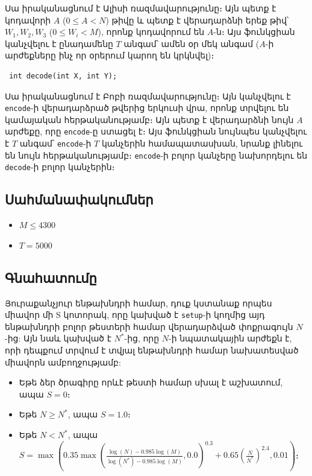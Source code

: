 \documentclass[12pt]{article}
\begin{document}
Սա իրականացնում է Ալիսի ռազմավարությունը։ Այն պետք է կոդավորի  $A$ ($0 \leq A < N$) թիվը և պետք է վերադարձնի երեք թիվ՝ $W_1, W_2, W_3$ ($0 \leq W_i < M$), որոնք կոդավորում են $A$-ն։ Այս ֆունկցիան կանչվելու է ընադամենը $T$ անգամ՝ ամեն օր մեկ անգամ ($A$-ի արժեքները ինչ որ օրերում կարող են կրկնվել)։

\begin{lstlisting}
 int decode(int X, int Y);
\end{lstlisting}

Սա իրականացնում է Բոբի ռազմավարությունը։ Այն կանչվելու է  \texttt{encode}-ի վերադարձրած թվերից երկուսի վրա, որոնք տրվելու են կամայական հերթականությամբ։ Այն պետք է վերադարձնի նույն $A$ արժեքը, որը \texttt{encode}-ը ստացել է։ Այս ֆունկցիան նույնպես կանչվելու է $T$ անգամ՝ \texttt{encode}-ի $T$ կանչերին համապատասխան, նրանք լինելու են նույն հերթականությամբ։ \texttt{encode}-ի բոլոր կանչերը նախորդելու են  \texttt{decode}-ի բոլոր կանչերին։

\subsection{Սահմանափակումներ}

\begin{itemize}
\item $M \leq 4300$
\item $T = 5000$
\end{itemize}

\subsection{Գնահատումը}

Յուրաքանչյուր ենթախնդրի համար, դուք կստանաք որպես միավոր մի S կոտորակ, որը կախված է \texttt{setup}-ի կողմից այդ ենթախնդրի բոլոր թեստերի համար վերադարձված փոքրագույն $N$-ից: Այն նաև կախված է $N^*$-ից, որը $N$-ի նպատակային արժեքն է, որի դեպքում տրվում է տվյալ ենթախնդրի համար նախատեսված միավորն ամբողջությամբ:

\begin{itemize}
\item Եթե ձեր ծրագիրը որևէ թեստի համար սխալ է աշխատում, ապա  $S = 0$։
\item Եթե $N \geq N^*$, ապա $S = 1.0$։
\item Եթե $N < N^*$, ապա $S = \max\left(0.35 \max\left(\frac{\log(N) - 0.985 \log(M)}{\log(N^*) - 0.985 \log(M)}, 0.0\right)^{0.3} + 0.65 \left(\frac{N}{N^*}\right)^{2.4}, 0.01\right)$։
\end{itemize}
\end{document}
